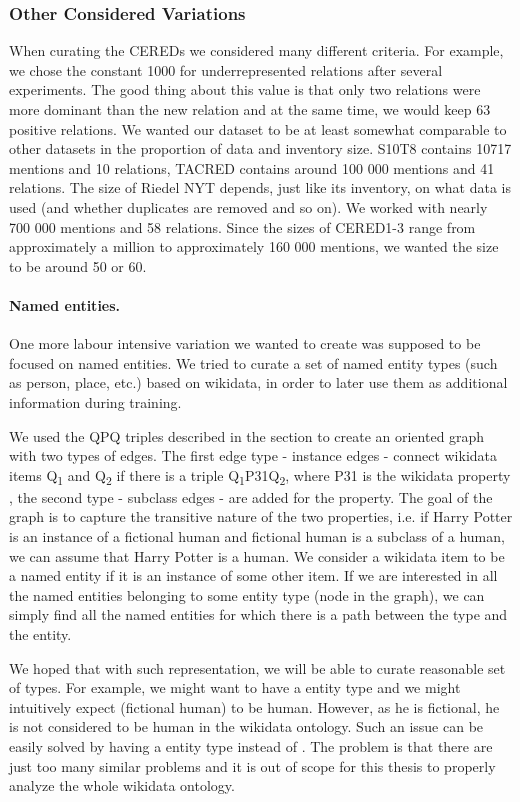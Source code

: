 \subsubsection{Other Considered Variations}
When curating the CEREDs we considered many different criteria. For example, we chose the constant 1000 for underrepresented relations after several experiments. The good thing about this value is that only two relations were more dominant than the new  relation and at the same time, we would keep 63 positive relations. We wanted our dataset to be at least somewhat comparable to other datasets in the proportion of data and inventory size. S10T8 contains 10717 mentions and 10 relations, TACRED contains around 100 000 mentions and 41 relations. The size of Riedel NYT depends, just like its inventory, on what data is used (and whether duplicates are removed and so on). We worked with nearly 700 000 mentions and 58 relations. Since the sizes of CERED1-3 range from approximately a million to approximately 160 000 mentions, we wanted the size to be around 50 or 60. 

\paragraph{Named entities.}

One more labour intensive variation we wanted to create was supposed to be focused on named entities. We tried to curate a set of named entity types (such as person, place, etc.) based on wikidata, in order to later use them as additional information during training. 

We used the QPQ triples described in the  section to create an oriented graph with two types of edges. The first edge type - instance edges - connect wikidata items Q\textsubscript{1} and Q\textsubscript{2} if there is a triple Q\textsubscript{1}P31Q\textsubscript{2}, where P31 is the wikidata property , the second type - subclass edges - are added for the  property. The goal of the graph is to capture the transitive nature of the two properties, i.e. if Harry Potter is an instance of a fictional human and fictional human is a subclass of a human, we can assume that Harry Potter is a human. We consider a wikidata item to be a named entity if it is an instance of some other item. If we are interested in all the named entities belonging to some entity type (node in the graph), we can simply find all the named entities for which there is a path between the type and the entity.

We hoped that with such representation, we will be able to curate reasonable set of types. For example, we might want to have a  entity type and we might intuitively expect  (fictional human) to be human. However, as he is fictional, he is not considered to be human in the wikidata ontology. Such an issue can be easily solved by having a  entity type instead of . The problem is that there are just too many similar problems and it is out of scope for this thesis to properly analyze the whole wikidata ontology. 


